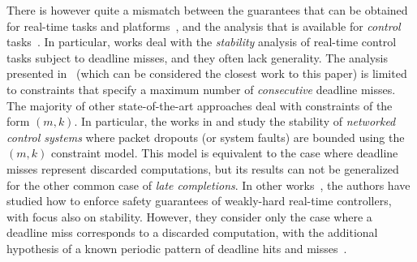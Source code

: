 There is however quite a mismatch between the guarantees that can be obtained for real-time tasks and platforms~\cite{Hammadeh:2017b, Hammadeh:2019, choi2019job, pazzaglia2020generalized}, and the analysis that is available for \emph{control} tasks~\cite{Pazzaglia:2018, Maggio:2020}.
In particular, works deal with the \emph{stability} analysis of real-time control tasks subject to deadline misses, and they often lack generality. 
The analysis presented in~\cite{Maggio:2020} (which can be considered the closest work to this paper) is limited to constraints that specify a maximum number of \emph{consecutive} deadline misses.
The majority of other state-of-the-art approaches deal with constraints of the form $(m,k)$.
In particular, the works in \cite{Linsenmayer:2017} and \cite{linsenmayer2020linear} study the stability of \emph{networked control systems} where packet dropouts (or system faults) are bounded using the $(m,k)$ constraint model. 
This model is equivalent to the case where deadline misses represent discarded computations, but its results can not be generalized for the other common case of \emph{late completions}.
In other works~\cite{huang2019exploring,liang2019security,liang2020leveraging}, the authors have studied how to enforce safety guarantees of weakly-hard real-time controllers, with focus also on stability. However, they consider only the case where a deadline miss corresponds to a discarded computation, with the additional hypothesis of a known periodic pattern of deadline hits and misses~\cite{liang2019security,liang2020leveraging}.

